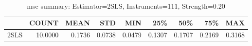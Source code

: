 \begin{table}[ht]
\centering
\caption{mse summary: Estimator=2SLS, Instruments=111, Strength=0.20}
\begin{tabular}{lrrrrrrrr}
\toprule
 & COUNT & MEAN & STD & MIN & 25\% & 50\% & 75\% & MAX \\
\midrule
2SLS & 10.0000 & 0.1736 & 0.0738 & 0.0479 & 0.1307 & 0.1707 & 0.2169 & 0.3168 \\
\bottomrule
\end{tabular}
\end{table}
